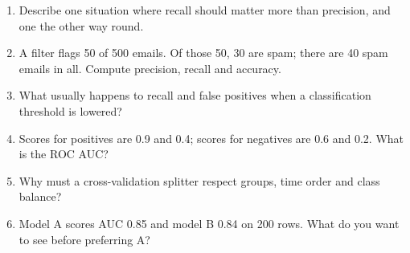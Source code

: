 \begin{quickcheck}
\begin{enumerate}
  \item Describe one situation where recall should matter more than precision, and one the other way round.
  \item A filter flags 50 of 500 emails. Of those 50, 30 are spam; there are 40 spam emails in all. Compute precision, recall and accuracy.
  \item What usually happens to recall and false positives when a classification threshold is lowered?
  \item Scores for positives are 0.9 and 0.4; scores for negatives are 0.6 and 0.2. What is the ROC AUC?
  \item Why must a cross-validation splitter respect groups, time order and class balance?
  \item Model A scores AUC 0.85 and model B 0.84 on 200 rows. What do you want to see before preferring A?
\end{enumerate}
\end{quickcheck}
